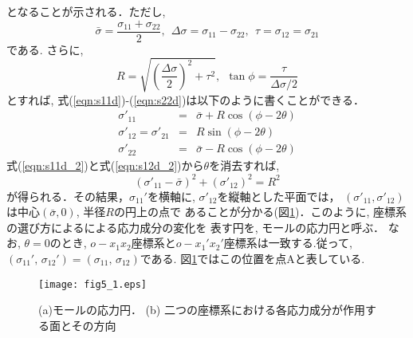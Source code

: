 \documentclass[10pt,a4j]{jbook}
\begin{document}
となることが示される．ただし, 
\begin{equation}
	\bar \sigma = \frac{\sigma_{11}+\sigma_{22}}{2}, \ \ 
	\Delta \sigma = \sigma_{11} -\sigma_{22}, \ \ 
	\tau = \sigma_{12}=\sigma_{21}
	\label{eqn:def_sig_bar}
\end{equation}
である. さらに,
\begin{equation}
	R=\sqrt{\left(\frac{\Delta \sigma}{2}\right)^2 + \tau ^2 }, \ \ 
	\tan \phi = \frac{\tau}{\Delta\sigma /2}
	\label{eqn:def_R}
\end{equation}
とすれば, 式(\ref{eqn:s11d})-(\ref{eqn:s22d})は以下のように書くことができる．
\begin{eqnarray}
	\sigma'_{11} &=& \bar{\sigma}+R \cos \left( \phi -2\theta \right) 
		\label{eqn:s11d_2} \\
	\sigma'_{12}=\sigma'_{21} &=&  R \sin \left( \phi -2 \theta \right)
		\label{eqn:s12d_2} \\
	\sigma'_{22} &=& \bar{\sigma} - R \cos \left( \phi-2\theta \right) 
		\label{eqn:s22d_2}
\end{eqnarray}
式(\ref{eqn:s11d_2})と式(\ref{eqn:s12d_2})から$\theta$を消去すれば, 
\begin{equation}
	\left( \sigma'_{11} -\bar{\sigma}\right)^2 + \left(\sigma'_{12}\right)^2 = R^2
\end{equation}
が得られる．その結果，$\sigma_{11}'$を横軸に, $\sigma'_{12}$を縦軸とした平面では，
$(\sigma'_{11}, \sigma'_{12})$は中心$(\bar{\sigma}, 0)$, 半径$R$の円上の点で
あることが分かる(図\ref{fig:fig5_1})．このように, 座標系の選び方によるによる応力成分の変化を
表す円を, モールの応力円と呼ぶ．
なお, $\theta=0$のとき, $o-x_1x_2$座標系と$o-x_1'x_2'$座標系は一致する.従って, 
$(\sigma_{11}',\,\sigma_{12}')= (\sigma_{11},\,\sigma_{12})$である.
図\ref{fig:fig5_1}ではこの位置を点Aと表している.
\begin{figure}[h]
	\begin{center}
	\texttt{[image: fig5\_1.eps]} 
	\end{center}
	\caption{
		(a)モールの応力円．
	(b) 二つの座標系における各応力成分が作用する面とその方向
	} 
	\label{fig:fig5_1}
\end{figure}
\end{document}
